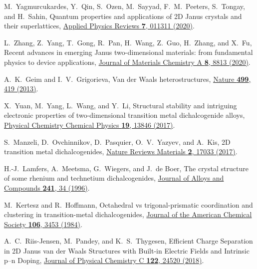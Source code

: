 \documentclass[reprint, superscriptaddress, amsmath,amssymb,prb,twocolumn]{revtex4-2}
\begin{document}
\begin{thebibliography}{116}
 M.~Yagmurcukardes, Y.~Qin, S.~Ozen, M.~Sayyad, F.~M.~Peeters, S.~Tongay, and H.~Sahin, Quantum properties and applications of 2D Janus crystals and their superlattices, \href{https://dx.doi.org/10.1063/1.5135306}{Applied Physics Reviews {\bf 7}, 011311 (2020)}. %

 L.~Zhang, Z.~Yang, T.~Gong, R.~Pan, H.~Wang, Z.~Guo, H.~Zhang, and X.~Fu, Recent advances in emerging Janus two-dimensional materials: from fundamental physics to device applications, \href{https://dx.doi.org/10.1039/d0ta01999b}{Journal of Materials Chemistry A {\bf 8}, 8813 (2020)}. %

 A.~K.~Geim and I.~V.~Grigorieva, Van der Waals heterostructures, \href{https://dx.doi.org/10.1038/nature12385}{Nature {\bf 499}, 419 (2013)}.

 X.~Yuan, M.~Yang, L.~Wang, and Y.~Li, Structural stability and intriguing electronic properties of two-dimensional transition metal dichalcogenide alloys, \href{https://dx.doi.org/10.1039/c7cp01727h}{Physical Chemistry Chemical Physics {\bf 19}, 13846 (2017)}.

 S.~Manzeli, D.~Ovchinnikov, D.~Pasquier, O.~V.~Yazyev, and A.~Kis, 2D transition metal dichalcogenides, \href{https://dx.doi.org/10.1038/natrevmats.2017.33}{Nature Reviews Materials {\bf 2}, 17033 (2017)}.


 H.-J.~Lamfers, A.~Meetsma, G.~Wiegers, and J.~de Boer, The crystal structure of some rhenium and technetium dichalcogenides, \href{https://dx.doi.org/10.1016/0925-8388(96)02313-4}{Journal of Alloys and Compounds {\bf 241}, 34 (1996)}.

 M.~Kertesz and R.~Hoffmann, Octahedral vs trigonal-prismatic coordination and clustering in transition-metal dichalcogenides, \href{https://dx.doi.org/10.1021/ja00324a012}{Journal of the American Chemical Society {\bf 106}, 3453 (1984)}.

 A.~C.~Riis-Jensen, M.~Pandey, and K.~S.~Thygesen, Efficient Charge Separation in 2D Janus van der Waals Structures with Built-in Electric Fields and Intrinsic p--n Doping, \href{https://dx.doi.org/10.1021/acs.jpcc.8b05792}{Journal of Physical Chemistry C {\bf 122}, 24520 (2018)}.


\end{thebibliography}
\end{document}

